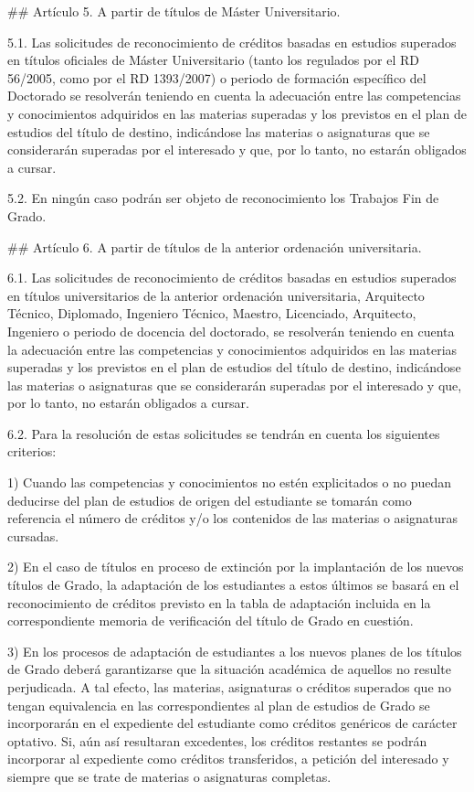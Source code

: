 \documentclass{article}
\begin{document}
\begin{itemize}
\begin{itemize}
\begin{scriptsize}
                  \#\# Artículo 5. A partir de títulos de Máster Universitario.

                  5.1. Las solicitudes de reconocimiento de créditos basadas en estudios superados en títulos oficiales de Máster Universitario (tanto los regulados por el RD 56/2005, como por el RD 1393/2007) o periodo de formación específico del Doctorado se resolverán teniendo en cuenta la adecuación entre las competencias y conocimientos adquiridos en las materias superadas y los previstos en el plan de estudios del título de destino, indicándose las materias o asignaturas que se considerarán superadas por el interesado y que, por lo tanto, no estarán obligados a cursar.

                  5.2. En ningún caso podrán ser objeto de reconocimiento los Trabajos Fin de Grado.

                  \#\# Artículo 6. A partir de títulos de la anterior ordenación universitaria.

                  6.1. Las solicitudes de reconocimiento de créditos basadas en estudios superados en títulos universitarios de la anterior ordenación universitaria, Arquitecto Técnico, Diplomado, Ingeniero Técnico, Maestro, Licenciado, Arquitecto, Ingeniero o periodo de docencia del doctorado, se resolverán teniendo en cuenta la adecuación entre las competencias y conocimientos adquiridos en las materias superadas y los previstos en el plan de estudios del título de destino, indicándose las materias o asignaturas que se considerarán superadas por el interesado y que, por lo tanto, no estarán obligados a cursar.

                  6.2. Para la resolución de estas solicitudes se tendrán en cuenta los siguientes criterios:

                  1) Cuando las competencias y conocimientos no estén explicitados o no puedan deducirse del plan de estudios de origen del estudiante se tomarán como referencia el número de créditos y/o los contenidos de las materias o asignaturas cursadas.

                  2) En el caso de títulos en proceso de extinción por la implantación de los nuevos títulos de Grado, la adaptación de los estudiantes a estos últimos se basará en el reconocimiento de créditos previsto en la tabla de adaptación incluida en la correspondiente memoria de verificación del título de Grado en cuestión.

                  3) En los procesos de adaptación de estudiantes a los nuevos planes de los títulos de Grado deberá garantizarse que la situación académica de aquellos no resulte perjudicada. A tal efecto, las materias, asignaturas o créditos superados que no tengan equivalencia en las correspondientes al plan de estudios de Grado se incorporarán en el expediente del estudiante como créditos genéricos de carácter optativo. Si, aún así resultaran excedentes, los créditos restantes se podrán incorporar al expediente como créditos transferidos, a petición del interesado y siempre que se trate de materias o asignaturas completas.


\end{scriptsize}
\end{itemize}
\end{itemize}
\end{document}
